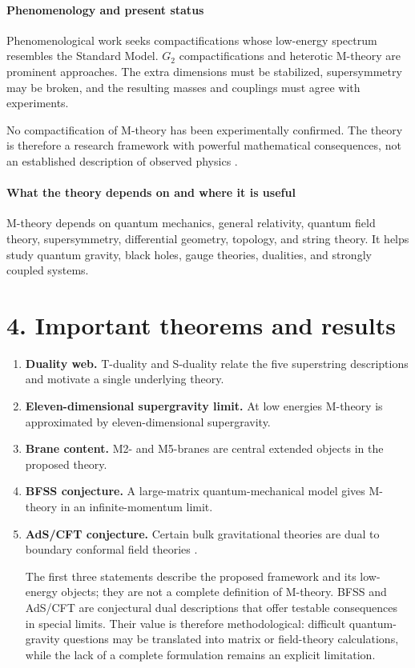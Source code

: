 \paragraph{Phenomenology and present status}
Phenomenological work seeks compactifications whose low-energy spectrum resembles the Standard Model. $G_2$ compactifications and heterotic M-theory are prominent approaches. The extra dimensions must be stabilized, supersymmetry may be broken, and the resulting masses and couplings must agree with experiments.

No compactification of M-theory has been experimentally confirmed. The theory is therefore a research framework with powerful mathematical consequences, not an established description of observed physics \cite{m_theory_ref4}.

\paragraph{What the theory depends on and where it is useful}
M-theory depends on quantum mechanics, general relativity, quantum field theory, supersymmetry, differential geometry, topology, and string theory. It helps study quantum gravity, black holes, gauge theories, dualities, and strongly coupled systems.

\section*{4. Important theorems and results}
\begin{enumerate}[leftmargin=*,itemsep=0.35em]
\item \textbf{Duality web.} T-duality and S-duality relate the five superstring descriptions and motivate a single underlying theory.

\item \textbf{Eleven-dimensional supergravity limit.} At low energies M-theory is approximated by eleven-dimensional supergravity.

\item \textbf{Brane content.} M2- and M5-branes are central extended objects in the proposed theory.

\item \textbf{BFSS conjecture.} A large-matrix quantum-mechanical model gives M-theory in an infinite-momentum limit.

\item \textbf{AdS/CFT conjecture.} Certain bulk gravitational theories are dual to boundary conformal field theories \cite{m_theory_ref3}.

The first three statements describe the proposed framework and its low-energy objects; they are not a complete definition of M-theory. BFSS and AdS/CFT are conjectural dual descriptions that offer testable consequences in special limits. Their value is therefore methodological: difficult quantum-gravity questions may be translated into matrix or field-theory calculations, while the lack of a complete formulation remains an explicit limitation.
\end{enumerate}

